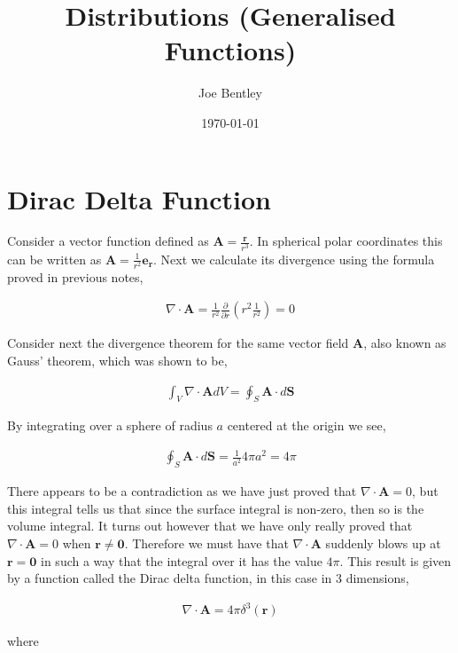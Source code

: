 \documentclass[11pt]{amsart}
\title{Distributions (Generalised Functions)}
\author{Joe Bentley}
\date{\today}
\begin{document}
\maketitle

\newpage

\section{Dirac Delta Function}

Consider a vector function defined as $\mathbf{A} = \frac{\mathbf{r}}{r^3}$. In spherical polar coordinates this can be written as $\mathbf{A} = \frac{1}{r^2} \mathbf{e_r}$. Next we calculate its divergence using the formula proved in previous notes,

\begin{align*}
  \nabla\cdot\mathbf{A} = \frac{1}{r^2}\frac{\partial}{\partial r}\left(r^2 \frac{1}{r^2}\right) = 0
\end{align*}

Consider next the divergence theorem for the same vector field $\mathbf{A}$, also known as Gauss' theorem, which was shown to be,

\begin{align*}
  \int_V \nabla\cdot\mathbf{A} dV = \oint_S \mathbf{A}\cdot d\mathbf{S}
\end{align*}

By integrating over a sphere of radius $a$ centered at the origin we see,

\begin{align*}
  \oint_S \mathbf{A}\cdot d\mathbf{S} = \frac{1}{a^2} 4\pi a^2 = 4\pi
\end{align*}

There appears to be a contradiction as we have just proved that $\nabla\cdot\mathbf{A} = 0$, but this integral tells us that since the surface integral is non-zero, then so is the volume integral. It turns out however that we have only really proved that $\nabla\cdot\mathbf{A} = 0$ when $\mathbf{r} \neq \mathbf{0}$. Therefore we must have that $\nabla\cdot\mathbf{A}$ suddenly blows up at $\mathbf{r} = \mathbf{0}$ in such a way that the integral over it has the value $4\pi$. This result is given by a function called the Dirac delta function, in this case in 3 dimensions,

\begin{align*}
  \nabla\cdot\mathbf{A} = 4\pi \delta^3(\mathbf{r})
\end{align*}

where
\end{document}
